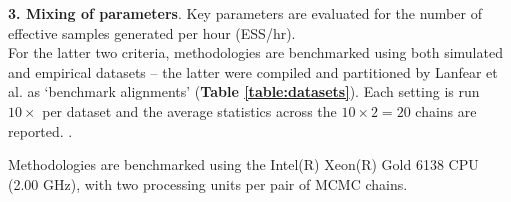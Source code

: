 \documentclass[10pt,letterpaper]{article}
\begin{document}
\textbf{3. Mixing of parameters}. Key parameters are evaluated for the number of effective samples generated per hour (ESS/hr). \\


For the latter two criteria, methodologies are benchmarked using both simulated and empirical datasets -- the latter were compiled \cite{lanfear2019Github} and partitioned \cite{lanfear2016partitionfinder} by Lanfear et al. as `benchmark alignments' (\textbf{Table \ref{table:datasets}}). Each setting is run $10 \times$ per dataset and the average statistics across the $10 \times 2 = 20$ chains are reported. .



Methodologies are benchmarked using the Intel(R) Xeon(R) Gold 6138 CPU (2.00 GHz), with two processing units per pair of MCMC chains.
\end{document}
